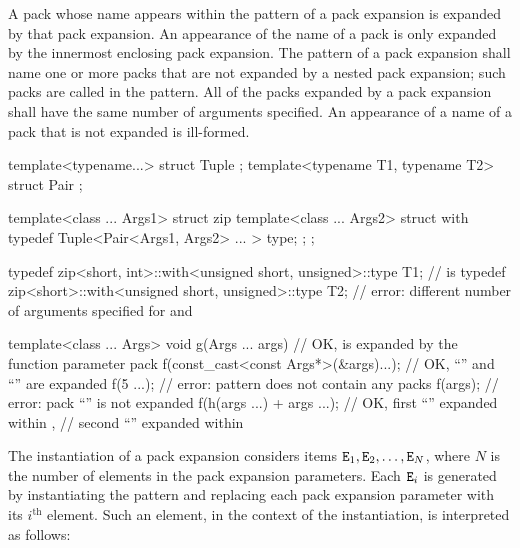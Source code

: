 \pnum
A pack whose name appears within the pattern of a pack
expansion is expanded by that pack expansion. An appearance of the name of
a pack is only expanded by the innermost enclosing pack expansion.
The pattern of a pack expansion shall name one or more packs that
are not expanded by a nested pack expansion; such packs are called
 in the pattern. All of the packs expanded
by a pack expansion shall have the same number of arguments specified. An
appearance of a name of a pack that is not expanded is
ill-formed.
\begin{example}
\begin{codeblock}
template<typename...> struct Tuple {};
template<typename T1, typename T2> struct Pair {};

template<class ... Args1> struct zip {
  template<class ... Args2> struct with {
    typedef Tuple<Pair<Args1, Args2> ... > type;
  };
};

typedef zip<short, int>::with<unsigned short, unsigned>::type T1;
    //  is 
typedef zip<short>::with<unsigned short, unsigned>::type T2;
    // error: different number of arguments specified for  and 

template<class ... Args>
  void g(Args ... args) {                   // OK,  is expanded by the function parameter pack 
    f(const_cast<const Args*>(&args)...);   // OK, ``'' and ``'' are expanded
    f(5 ...);                               // error: pattern does not contain any packs
    f(args);                                // error: pack ``'' is not expanded
    f(h(args ...) + args ...);              // OK, first ``'' expanded within ,
                                            // second ``'' expanded within 
  }
\end{codeblock}
\end{example}

\pnum
The instantiation of a pack expansion considers
items $\texttt{\protect E}_1, \texttt{\protect E}_2, \dotsc, \texttt{\protect E}_N$,
where
$N$ is the number of elements in the pack expansion parameters.
Each $\texttt{\protect E}_i$ is generated by instantiating the pattern and
replacing each pack expansion parameter with its $i^\text{th}$ element.
Such an element, in the context of the instantiation, is interpreted as
follows:

